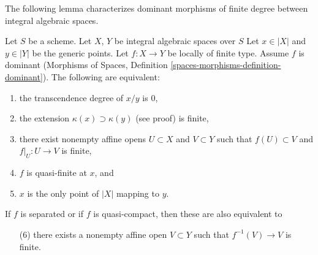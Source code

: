 \noindent
The following lemma characterizes dominant morphisms of finite degree
between integral algebraic spaces.

\begin{lemma}
\label{lemma-finite-degree}
Let $S$ be a scheme. Let $X$, $Y$ be integral algebraic spaces over $S$
Let $x \in |X|$ and $y \in |Y|$ be the generic points. Let $f : X \to Y$
be locally of finite type. Assume $f$ is dominant
(Morphisms of Spaces, Definition \ref{spaces-morphisms-definition-dominant}).
The following are equivalent:
\begin{enumerate}
\item the transcendence degree of $x/y$ is $0$,
\item the extension $\kappa(x) \supset \kappa(y)$ (see proof) is finite,
\item there exist nonempty affine opens $U \subset X$ and $V \subset Y$
such that $f(U) \subset V$ and $f|_U : U \to V$ is finite,
\item $f$ is quasi-finite at $x$, and
\item $x$ is the only point of $|X|$ mapping to $y$.
\end{enumerate}
If $f$ is separated or if $f$ is quasi-compact, then these are
also equivalent to
\begin{enumerate}
\item[(6)] there exists a nonempty affine open $V \subset Y$ such
that $f^{-1}(V) \to V$ is finite.
\end{enumerate}
\end{lemma}

